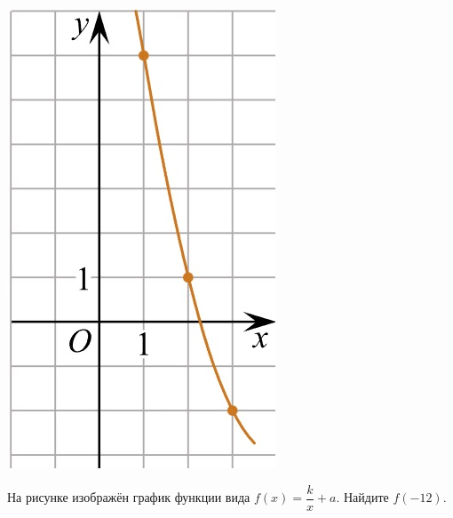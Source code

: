 \begin{class}[number=4]
\begin{listofex}
\begin{minipage}[c]{0.25\textwidth}
			\includegraphics[align=t, width=\textwidth]{pics/G101M4C4-6.jpg}
		\end{minipage}
		\item
		\begin{minipage}[t]{0.67\textwidth}
			На рисунке изображён график функции вида \(f(x)=\dfrac{k}{x}+a\). Найдите \(f(-12)\).
		\end{minipage}
		\begin{minipage}[c]{0.25\textwidth}

\end{minipage}
\end{listofex}
\end{class}
